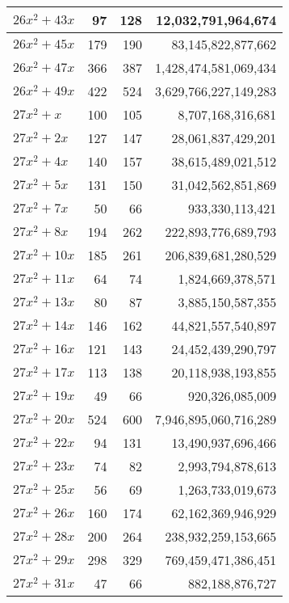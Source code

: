 \documentclass[a4paper]{amsproc}
\theoremstyle{plain}
\begin{document}
\begin{longtable}{ | l | r | r | r | }
$26x^2 + 43x$ & 97 & 128 & 12{,}032{,}791{,}964{,}674 \\ \hline
$26x^2 + 45x$ & 179 & 190 & 83{,}145{,}822{,}877{,}662 \\ \hline
$26x^2 + 47x$ & 366 & 387 & 1{,}428{,}474{,}581{,}069{,}434 \\ \hline
$26x^2 + 49x$ & 422 & 524 & 3{,}629{,}766{,}227{,}149{,}283 \\ \hline
$27x^2 + x$ & 100 & 105 & 8{,}707{,}168{,}316{,}681 \\ \hline
$27x^2 + 2x$ & 127 & 147 & 28{,}061{,}837{,}429{,}201 \\ \hline
$27x^2 + 4x$ & 140 & 157 & 38{,}615{,}489{,}021{,}512 \\ \hline
$27x^2 + 5x$ & 131 & 150 & 31{,}042{,}562{,}851{,}869 \\ \hline
$27x^2 + 7x$ & 50 & 66 & 933{,}330{,}113{,}421 \\ \hline
$27x^2 + 8x$ & 194 & 262 & 222{,}893{,}776{,}689{,}793 \\ \hline
$27x^2 + 10x$ & 185 & 261 & 206{,}839{,}681{,}280{,}529 \\ \hline
$27x^2 + 11x$ & 64 & 74 & 1{,}824{,}669{,}378{,}571 \\ \hline
$27x^2 + 13x$ & 80 & 87 & 3{,}885{,}150{,}587{,}355 \\ \hline
$27x^2 + 14x$ & 146 & 162 & 44{,}821{,}557{,}540{,}897 \\ \hline
$27x^2 + 16x$ & 121 & 143 & 24{,}452{,}439{,}290{,}797 \\ \hline
$27x^2 + 17x$ & 113 & 138 & 20{,}118{,}938{,}193{,}855 \\ \hline
$27x^2 + 19x$ & 49 & 66 & 920{,}326{,}085{,}009 \\ \hline
$27x^2 + 20x$ & 524 & 600 & 7{,}946{,}895{,}060{,}716{,}289 \\ \hline
$27x^2 + 22x$ & 94 & 131 & 13{,}490{,}937{,}696{,}466 \\ \hline
$27x^2 + 23x$ & 74 & 82 & 2{,}993{,}794{,}878{,}613 \\ \hline
$27x^2 + 25x$ & 56 & 69 & 1{,}263{,}733{,}019{,}673 \\ \hline
$27x^2 + 26x$ & 160 & 174 & 62{,}162{,}369{,}946{,}929 \\ \hline
$27x^2 + 28x$ & 200 & 264 & 238{,}932{,}259{,}153{,}665 \\ \hline
$27x^2 + 29x$ & 298 & 329 & 769{,}459{,}471{,}386{,}451 \\ \hline
$27x^2 + 31x$ & 47 & 66 & 882{,}188{,}876{,}727 \\ \hline

\end{longtable}
\end{document}

